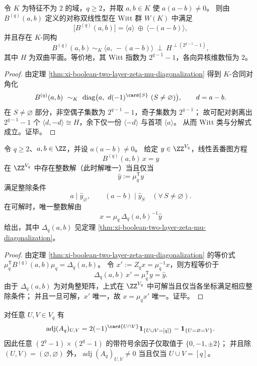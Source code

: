 \begin{theorem}\label{thm:xi-boolean-two-layer-witt-core}
令 \(K\) 为特征不为 \(2\) 的域，\(q\ge 2\)，并取 \(a,b\in K\) 使 \(a(a-b)\neq 0\)。
则由 \(B^{(q)}(a,b)\) 定义的对称双线性型在 Witt 群 \(W(K)\) 中满足
\[
\bigl[B^{(q)}(a,b)\bigr]=\langle a\rangle\ \oplus\ \langle -(a-b)\rangle,
\]
并且存在 \(K\)-同构
\[
B^{(q)}(a,b)\ \sim_K\ \langle a,\,-(a-b)\rangle\ \perp\ H^{\perp(2^{q-1}-1)},
\]
其中 \(H\) 为双曲平面。等价地，其 Witt 指数为 \(2^{q-1}-1\)，各向异核维数恒为 \(2\)。
\end{theorem}
\begin{proof}
由定理 \ref{thm:xi-boolean-two-layer-zeta-mu-diagonalization} 得到 \(K\)-合同对角化
\[
B^{(q)}(a,b)\ \sim_K\ \operatorname{diag}\bigl(a,\ d(-1)^{\card{S}}\ (S\neq\varnothing)\bigr),
\qquad d=a-b.
\]
在 \(S\neq\varnothing\) 部分，非空偶子集数为 \(2^{q-1}-1\)，奇子集数为 \(2^{q-1}\)；
故可配对剥离出 \(2^{q-1}-1\) 个 \(\langle d,-d\rangle\cong H\)，余下仅一份 \(\langle -d\rangle\) 与首项 \(\langle a\rangle\)。
从而 Witt 类与分解式成立。证毕。
\end{proof}

\begin{theorem}\label{thm:xi-boolean-two-layer-mobius-diophantine-criterion}
令 \(q\ge 2\)、\(a,b\in\ZZ\)，并设 \(a(a-b)\neq 0\)。
给定 \(y\in\ZZ^{V_q}\)，线性丢番图方程
\[
B^{(q)}(a,b)\,x=y
\]
在 \(\ZZ^{V_q}\) 中存在整数解（此时解唯一）当且仅当
\[
\widehat y:=\mu_q^{\mathsf T}y
\]
满足整除条件
\[
a\mid \widehat y_{\varnothing},
\qquad
(a-b)\mid \widehat y_S\quad(\forall\,S\neq\varnothing).
\]
在可解时，唯一整数解由
\[
x=\mu_q\,\Delta_q(a,b)^{-1}\widehat y
\]
给出，其中 \(\Delta_q(a,b)\) 见定理 \ref{thm:xi-boolean-two-layer-zeta-mu-diagonalization}。
\end{theorem}
\begin{proof}
由定理 \ref{thm:xi-boolean-two-layer-zeta-mu-diagonalization} 的等价式
\(\mu_q^{\mathsf T}B^{(q)}(a,b)\mu_q=\Delta_q(a,b)\)。
令 \(x':=Z_qx=\mu_q^{-1}x\)，则方程等价于
\[
\Delta_q(a,b)\,x'=\mu_q^{\mathsf T}y=\widehat y.
\]
由于 \(\Delta_q(a,b)\) 为对角整矩阵，上式在 \(\ZZ^{V_q}\) 中可解当且仅当各坐标满足相应整除条件；
并且一旦可解，\(x'\) 唯一，故 \(x=\mu_qx'\) 唯一。证毕。
\end{proof}

\begin{corollary}[伴随矩阵的覆盖支撑与带符号余因子值域]\label{cor:xi-disjointness-boolean-adjugate-cover-support}
对任意 \(U,V\in V_q\) 有
\[
\operatorname{adj}(A_q)_{U,V}
=
2(-1)^{\card{U\cap V}}\mathbf 1_{\{U\cup V=[q]\}}
-\mathbf 1_{\{U=\varnothing=V\}}.
\]
因此任意 \((2^q-1)\times(2^q-1)\) 的带符号余因子仅取值于 \(\{0,-1,\pm2\}\)；
并且除 \((U,V)=(\varnothing,\varnothing)\) 外，\(\operatorname{adj}(A_q)_{U,V}\neq 0\) 当且仅当 \(U\cup V=[q]\)。
\end{corollary}

